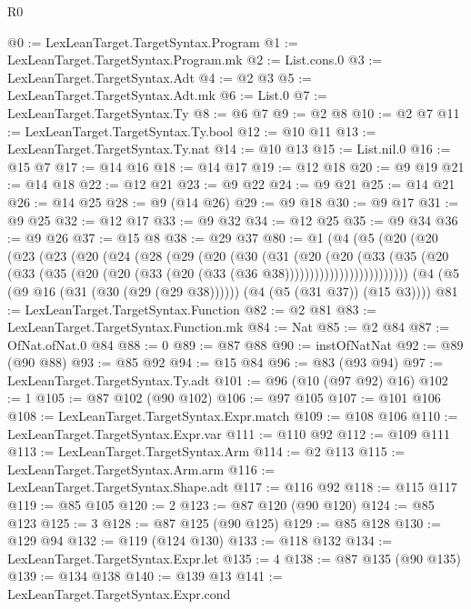 \begin{lexlean}{R0}
\begin{coremodule}
@0 := LexLeanTarget.TargetSyntax.Program
@1 := LexLeanTarget.TargetSyntax.Program.mk
@2 := List.cons.{0}
@3 := LexLeanTarget.TargetSyntax.Adt
@4 := @2 @3
@5 := LexLeanTarget.TargetSyntax.Adt.mk
@6 := List.{0}
@7 := LexLeanTarget.TargetSyntax.Ty
@8 := @6 @7
@9 := @2 @8
@10 := @2 @7
@11 := LexLeanTarget.TargetSyntax.Ty.bool
@12 := @10 @11
@13 := LexLeanTarget.TargetSyntax.Ty.nat
@14 := @10 @13
@15 := List.nil.{0}
@16 := @15 @7
@17 := @14 @16
@18 := @14 @17
@19 := @12 @18
@20 := @9 @19
@21 := @14 @18
@22 := @12 @21
@23 := @9 @22
@24 := @9 @21
@25 := @14 @21
@26 := @14 @25
@28 := @9 (@14 @26)
@29 := @9 @18
@30 := @9 @17
@31 := @9 @25
@32 := @12 @17
@33 := @9 @32
@34 := @12 @25
@35 := @9 @34
@36 := @9 @26
@37 := @15 @8
@38 := @29 @37
@80 := @1
    (@4
      (@5
        (@20
          (@20
            (@23
              (@23
                (@20
                  (@24
                    (@28
                      (@29
                        (@20
                          (@30
                            (@31
                              (@20
                                (@20
                                  (@33
                                    (@35
                                      (@20
                                        (@33
                                          (@35
                                            (@20
                                              (@20 (@33 (@20 (@33 (@36 @38)))))))))))))))))))))))))
      (@4 (@5 (@9 @16 (@31 (@30 (@29 (@29 @38)))))) (@4 (@5 (@31 @37)) (@15 @3))))
@81 := LexLeanTarget.TargetSyntax.Function
@82 := @2 @81
@83 := LexLeanTarget.TargetSyntax.Function.mk
@84 := Nat
@85 := @2 @84
@87 := OfNat.ofNat.{0} @84
@88 := 0
@89 := @87 @88
@90 := instOfNatNat
@92 := @89 (@90 @88)
@93 := @85 @92
@94 := @15 @84
@96 := @83 (@93 @94)
@97 := LexLeanTarget.TargetSyntax.Ty.adt
@101 := @96 (@10 (@97 @92) @16)
@102 := 1
@105 := @87 @102 (@90 @102)
@106 := @97 @105
@107 := @101 @106
@108 := LexLeanTarget.TargetSyntax.Expr.match
@109 := @108 @106
@110 := LexLeanTarget.TargetSyntax.Expr.var
@111 := @110 @92
@112 := @109 @111
@113 := LexLeanTarget.TargetSyntax.Arm
@114 := @2 @113
@115 := LexLeanTarget.TargetSyntax.Arm.arm
@116 := LexLeanTarget.TargetSyntax.Shape.adt
@117 := @116 @92
@118 := @115 @117
@119 := @85 @105
@120 := 2
@123 := @87 @120 (@90 @120)
@124 := @85 @123
@125 := 3
@128 := @87 @125 (@90 @125)
@129 := @85 @128
@130 := @129 @94
@132 := @119 (@124 @130)
@133 := @118 @132
@134 := LexLeanTarget.TargetSyntax.Expr.let
@135 := 4
@138 := @87 @135 (@90 @135)
@139 := @134 @138
@140 := @139 @13
@141 := LexLeanTarget.TargetSyntax.Expr.cond

\end{coremodule}
\end{lexlean}
